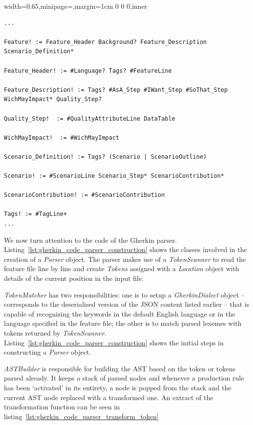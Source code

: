 \documentclass[dissertation,final]{softeng}
\newenvironment{featurecode}[1]
{ \lrbox\featurebox \begin{adjustbox}{width=#1\textwidth,minipage=\textwidth,margin=1cm 0 0 0,inner} }
{ \end{adjustbox}\endlrbox}
\newenvironment{featurelist}[2]
{
\newcommand{\setcaption}{\caption{#1}}
\newcommand{\setlabel}{\label{#2}}
}
{\begin{listing}[h!]\centering\usebox\featurebox\setcaption\setlabel\end{listing}}
\begin{document}
\begin{featurelist}{Changes to gherkin grammar}{lst:changes_to_gherkin_grammar}
\begin{featurecode}{0.65}
\begin{verbatim}
...

Feature! := Feature_Header Background? Feature_Description Scenario_Definition*

Feature_Header! := #Language? Tags? #FeatureLine

Feature_Description! := Tags? #AsA_Step #IWant_Step #SoThat_Step WichMayImpact* Quality_Step?

Quality_Step!  := #QualityAttributeLine DataTable

WichMayImpact!  := #WichMayImpact

Scenario_Definition! := Tags? (Scenario | ScenarioOutline)

Scenario! := #ScenarioLine Scenario_Step* ScenarioContribution*

ScenarioContribution! := #ScenarioContribution

Tags! := #TagLine+
...

\end{verbatim}
\end{featurecode}
\end{featurelist}

We now turn attention to the code of the Gherkin parser. Listing~\ref{lst:gherkin_code_parser_construction} shows the classes involved in the creation of a \emph{Parser} object. The parser makes use of a \emph{TokenScanner} to read the feature file line by line and create \emph{Tokens} assigned with a \emph{Location} object with details of the current position in the input file.

\emph{TokenMatcher} has two responsibilities: one is to setup a \emph{GherkinDialect} object -- corresponds to the deserialised version of the JSON content listed earlier -- that is capable of recognizing the keywords in the default English language or in the language specified in the feature file; the other is to match parsed lexemes with tokens returned by \emph{TokenScanner}. Listing~\ref{lst:gherkin_code_parser_construction} shows the initial steps in constructing a \emph{Parser} object.

\emph{ASTBuilder} is responsible for building the AST based on the token or tokens parsed already. It keeps a stack of parsed nodes and whenever a production rule has been `activated' in its entirety, a node is popped from the stack and the current AST node replaced with a transformed one. An extract of the transformation function can be seen in listing~\ref{lst:gherkin_code_parser_transform_token} 
\end{document}
